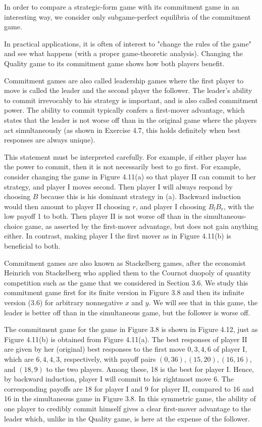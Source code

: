 \documentclass[12pt]{article}
\begin{document}
In order to compare a strategic-form game with its commitment game in an interesting way, we consider only subgame-perfect equilibria of the commitment game.

In practical applications, it is often of interest to "change the rules of the game" and see what happens (with a proper game-theoretic analysis). Changing the Quality game to its commitment game shows how both players benefit.

Commitment games are also called leadership games where the first player to move is called the leader and the second player the follower. The leader's ability to commit irrevocably to his strategy is important, and is also called commitment power. The ability to commit typically confers a first-mover advantage, which states that the leader is not worse off than in the original game where the players act simultaneously (as shown in Exercise 4.7, this holds definitely when best responses are always unique).

This statement must be interpreted carefully. For example, if either player has the power to commit, then it is not necessarily best to go first. For example, consider changing the game in Figure 4.11(a) so that player II can commit to her strategy, and player I moves second. Then player I will always respond by choosing $B$ because this is his dominant strategy in (a). Backward induction would then amount to player II choosing $r$, and player I choosing $B_{l} B_{r}$, with the low payoff 1 to both. Then player II is not worse off than in the simultaneous-choice game, as asserted by the first-mover advantage, but does not gain anything either. In contrast, making player I the first mover as in Figure 4.11(b) is beneficial to both.

Commitment games are also known as Stackelberg games, after the economist Heinrich von Stackelberg who applied them to the Cournot duopoly of quantity competition such as the game that we considered in Section 3.6. We study this commitment game first for its finite version in Figure 3.8 and then its infinite version (3.6) for arbitrary nonnegative $x$ and $y$. We will see that in this game, the leader is better off than in the simultaneous game, but the follower is worse off.

The commitment game for the game in Figure 3.8 is shown in Figure 4.12, just as Figure 4.11(b) is obtained from Figure 4.11(a). The best responses of player II are given by her (original) best responses to the first move $0,3,4,6$ of player I, which are $6,4,4,3$, respectively, with payoff pairs $(0,36),(15,20),(16,16)$, and $(18,9)$ to the two players. Among these, 18 is the best for player I. Hence, by backward induction, player I will commit to his rightmost move 6. The corresponding payoffs are 18 for player I and 9 for player II, compared to 16 and 16 in the simultaneous game in Figure 3.8. In this symmetric game, the ability of one player to credibly commit himself gives a clear first-mover advantage to the leader which, unlike in the Quality game, is here at the expense of the follower.
\end{document}
